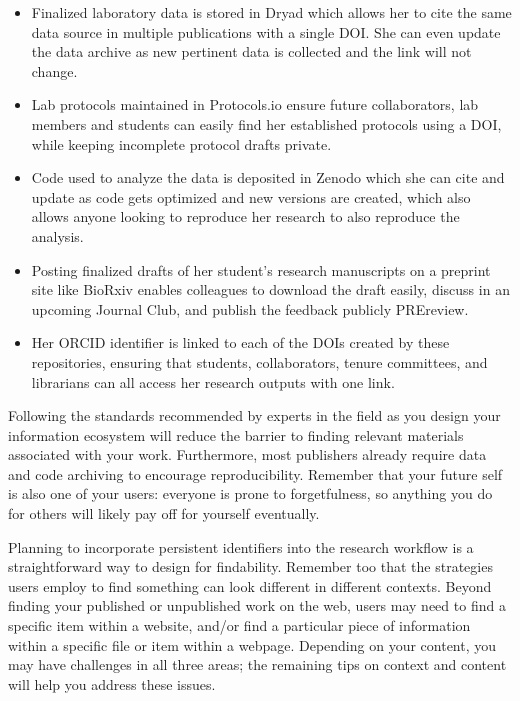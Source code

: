 \documentclass[10pt,letterpaper]{article}
\begin{document}
\begin{itemize}

\item
  Finalized laboratory data is stored in Dryad\cite{DRYAD2020} which allows her 
  to cite the same data source in multiple publications with a single DOI. She can even 
  update the data archive as new pertinent data is collected and the link will not change.
 
\item
  Lab protocols maintained in Protocols.io\cite{Teytelman2016} ensure future
  collaborators, lab members and students can easily find her established
  protocols using a DOI, while keeping incomplete protocol drafts private.

\item
  Code used to analyze the data is deposited in Zenodo\cite{ZENODO2020} which
  she can cite and update as code gets optimized and new versions are created,
  which also allows anyone looking to reproduce her research to also reproduce
  the analysis.

\item
  Posting finalized drafts of her student's research manuscripts on a preprint
  site like BioRxiv\cite{bioRxiv2020} enables colleagues to download the draft
  easily, discuss in an upcoming Journal Club, and publish the feedback publicly PREreview\cite{PREreview2020}.
  
  \item
  Her ORCID identifier is linked to each of the DOIs created by these
  repositories, ensuring that students, collaborators, tenure committees, and
  librarians can all access her research outputs with one link.

\end{itemize}

\noindent
Following the standards recommended by experts\cite{Wilkinson2016} in the field
as you design your information ecosystem will reduce the barrier to finding
relevant materials associated with your work. Furthermore, most publishers already
require data and code archiving to encourage reproducibility. Remember that your future self is
also one of your users: everyone is prone to forgetfulness, so anything you do
for others will likely pay off for yourself eventually\cite{Briney2015}.

Planning to incorporate persistent identifiers into the research workflow is a
straightforward way to design for findability. Remember too that the strategies
users employ to find something can look different in different contexts. Beyond
finding your published or unpublished work on the web, users may need to find a
specific item within a website, and/or find a particular piece of information
within a specific file or item within a webpage. Depending on your content, you
may have challenges in all three areas; the remaining tips on context and
content will help you address these issues.
\end{document}
